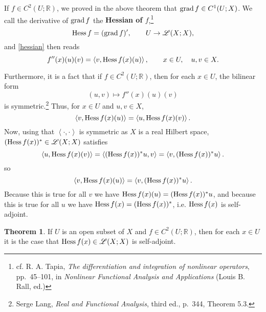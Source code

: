 \documentclass{article}
\newcommand{\inner}[2]{\left\langle #1, #2 \right\rangle}
\newcommand{\grad}{\ensuremath\mathrm{grad}\,}
\newcommand{\Hess}{\ensuremath\mathrm{Hess}\,}
\theoremstyle{definition}
\newtheorem{theorem}{Theorem}
\theoremstyle{definition}
\begin{document}
If $f \in C^2(U;\mathbb{R})$, we proved in the above theorem that
$\grad f \in C^1(U;X)$. We call the derivative of $\grad f$ the \textbf{Hessian of $f$},\footnote{cf. 
R. A. Tapia, {\em The differentiation and integration of nonlinear operators},
pp.~45--101, in {\em Nonlinear Functional Analysis and Applications} (Louis B. Rall, ed.)}
\[
\Hess f  = (\grad f)', \qquad U \to \mathscr{L}(X;X),
\]
and \eqref{hessian} then reads
\[
f''(x)(u)(v) = \inner{v}{\Hess f(x)(u)}, \qquad x \in U, \quad u,v \in X.
\]

Furthermore, it is a fact that if $f \in C^2(U;\mathbb{R})$, then for each $x \in U$, the bilinear form
\[
(u,v) \mapsto f''(x)(u)(v)
\]
is symmetric.\footnote{Serge Lang, {\em Real and Functional Analysis}, third ed.,
p.~344, Theorem 5.3.}
Thus, for $x \in U$ and $u,v \in X$,
\[
\inner{v}{\Hess f(x)(u)} = \inner{u}{\Hess f(x)(v)}.
\]
Now, using that $\inner{\cdot}{\cdot}$ is symmetric as $X$ is a real Hilbert space, $(\Hess f(x))^* \in \mathscr{L}(X;X)$ satisfies
\[
 \inner{u}{\Hess f(x)(v)} = \inner{(\Hess f(x))^*u}{v} = \inner{v}{(\Hess f(x))^*u}.
\]
so 
\[
\inner{v}{\Hess f(x)(u)} =  \inner{v}{(\Hess f(x))^*u}.
\]
Because this is true for all $v$ we have $\Hess f(x)(u)=(\Hess f(x))^*u$, and because this is true for all $u$ we have
$\Hess f(x)=(\Hess f(x))^*$, i.e. $\Hess f(x)$ is self-adjoint.

\begin{theorem}
If $U$ is an open  subset of $X$ and $f \in C^2(U;\mathbb{R})$, then
for each $x \in U$ it is the case that $\Hess f(x) \in \mathscr{L}(X;X)$ is self-adjoint.
\label{selfadjoint}
\end{theorem}
\end{document}
